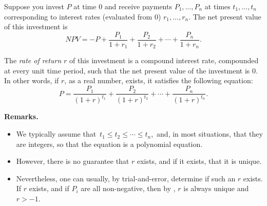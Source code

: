 \documentclass[12pt]{article}
\begin{document}
Suppose you invest $P$ at time $0$ and receive payments $P_1,\ldots, P_n$ at times $t_1,\ldots,t_n$ corresponding to interest rates (evaluated from $0$) $r_1,\ldots, r_n$.  The net present value of this investment is 
$$NPV=-P+\frac{P_1}{1+r_1}+\frac{P_2}{1+r_2}+\cdots+\frac{P_n}{1+r_n}.$$

The \emph{rate of return} $r$ of this investment is a compound interest rate, compounded at every unit time period, such that the net present value of the investment is $0$.  In other words, if $r$, as a real number, exists, it satisfies the following equation:
$$P=\frac{P_1}{(1+r)^{t_1}}+\frac{P_2}{(1+r)^{t_2}}+\cdots+\frac{P_n}{(1+r)^{t_n}}.$$

\textbf{Remarks.}
\begin{itemize}
\item We typically assume that\, $t_1\le t_2\le \cdots \le t_n$,\, and, in most situations, that they are integers, so that the equation is a polynomial equation.
\item However, there is no guarantee that $r$ exists, and if it exists, that it is unique.
\item Nevertheless, one can usually, by trial-and-error, determine if such an $r$ exists.  If $r$ exists, and if $P_i$ are all non-negative, then by , $r$ is always unique and $r>-1$.
\end{itemize}
\end{document}
